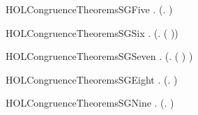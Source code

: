 \newcommand{\HOLCongruenceTheoremsSGFour}{\UseVerbatim{HOLCongruenceTheoremsSGFour}}
\begin{SaveVerbatim}{HOLCongruenceTheoremsSGFive}
\HOLTokenTurnstile{} \HOLSymConst{\HOLTokenForall{}} .   \HOLSymConst{\HOLTokenConj{}}   \HOLSymConst{\HOLTokenImp{}}  (\HOLTokenLambda{}.   \HOLSymConst{\ensuremath{\parallel}}  )
\end{SaveVerbatim}
\newcommand{\HOLCongruenceTheoremsSGFive}{\UseVerbatim{HOLCongruenceTheoremsSGFive}}
\begin{SaveVerbatim}{HOLCongruenceTheoremsSGSix}
\HOLTokenTurnstile{} \HOLSymConst{\HOLTokenForall{}} .   \HOLSymConst{\HOLTokenImp{}}  (\HOLTokenLambda{}. \HOLConst{\ensuremath{\nu}}  ( ))
\end{SaveVerbatim}
\newcommand{\HOLCongruenceTheoremsSGSix}{\UseVerbatim{HOLCongruenceTheoremsSGSix}}
\begin{SaveVerbatim}{HOLCongruenceTheoremsSGSeven}
\HOLTokenTurnstile{} \HOLSymConst{\HOLTokenForall{}} .   \HOLSymConst{\HOLTokenImp{}}  (\HOLTokenLambda{}.  ( ) )
\end{SaveVerbatim}
\newcommand{\HOLCongruenceTheoremsSGSeven}{\UseVerbatim{HOLCongruenceTheoremsSGSeven}}
\begin{SaveVerbatim}{HOLCongruenceTheoremsSGEight}
\HOLTokenTurnstile{} \HOLSymConst{\HOLTokenForall{}}.  (\HOLTokenLambda{}. \HOLConst{\ensuremath{\tau}} ) \HOLSymConst{\HOLTokenImp{}}  
\end{SaveVerbatim}
\newcommand{\HOLCongruenceTheoremsSGEight}{\UseVerbatim{HOLCongruenceTheoremsSGEight}}
\begin{SaveVerbatim}{HOLCongruenceTheoremsSGNine}
\HOLTokenTurnstile{} \HOLSymConst{\HOLTokenForall{}} .  (\HOLTokenLambda{}.   \HOLSymConst{\ensuremath{+}}  ) \HOLSymConst{\HOLTokenImp{}}   \HOLSymConst{\HOLTokenConj{}}  
\end{SaveVerbatim}

